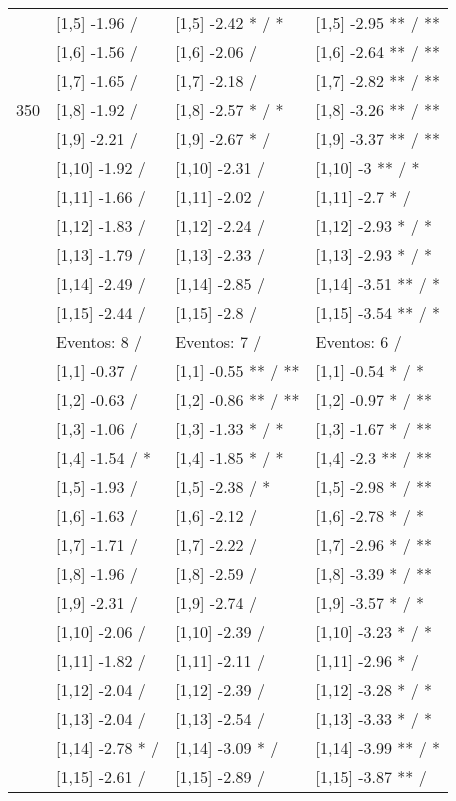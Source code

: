 \begin{table}
\begin{tabular}[t]{llll}
 & {}[1,5] -1.96  / & {}[1,5] -2.42 * / * & {}[1,5] -2.95 ** / **\\
 & {}[1,6] -1.56  / & {}[1,6] -2.06  / & {}[1,6] -2.64 ** / **\\
 & {}[1,7] -1.65  / & {}[1,7] -2.18  / & {}[1,7] -2.82 ** / **\\
350 & {}[1,8] -1.92  / & {}[1,8] -2.57 * / * & {}[1,8] -3.26 ** / **\\
\addlinespace
 & {}[1,9] -2.21  / & {}[1,9] -2.67 * / & {}[1,9] -3.37 ** / **\\
 & {}[1,10] -1.92  / & {}[1,10] -2.31  / & {}[1,10] -3 ** / *\\
 & {}[1,11] -1.66  / & {}[1,11] -2.02  / & {}[1,11] -2.7 * /\\
 & {}[1,12] -1.83  / & {}[1,12] -2.24  / & {}[1,12] -2.93 * / *\\
 & {}[1,13] -1.79  / & {}[1,13] -2.33  / & {}[1,13] -2.93 * / *\\
\addlinespace
 & {}[1,14] -2.49  / & {}[1,14] -2.85  / & {}[1,14] -3.51 ** / *\\
 & {}[1,15] -2.44  / & {}[1,15] -2.8  / & {}[1,15] -3.54 ** / *\\
 & Eventos:  8 / & Eventos:  7 / & Eventos:  6 /\\
 & {}[1,1] -0.37  / & {}[1,1] -0.55 ** / ** & {}[1,1] -0.54 * / *\\
 & {}[1,2] -0.63  / & {}[1,2] -0.86 ** / ** & {}[1,2] -0.97 * / **\\
\addlinespace
 & {}[1,3] -1.06  / & {}[1,3] -1.33 * / * & {}[1,3] -1.67 * / **\\
 & {}[1,4] -1.54  / * & {}[1,4] -1.85 * / * & {}[1,4] -2.3 ** / **\\
 & {}[1,5] -1.93  / & {}[1,5] -2.38  / * & {}[1,5] -2.98 * / **\\
 & {}[1,6] -1.63  / & {}[1,6] -2.12  / & {}[1,6] -2.78 * / *\\
 & {}[1,7] -1.71  / & {}[1,7] -2.22  / & {}[1,7] -2.96 * / **\\
\addlinespace
500 & {}[1,8] -1.96  / & {}[1,8] -2.59  / & {}[1,8] -3.39 * / **\\
 & {}[1,9] -2.31  / & {}[1,9] -2.74  / & {}[1,9] -3.57 * / *\\
 & {}[1,10] -2.06  / & {}[1,10] -2.39  / & {}[1,10] -3.23 * / *\\
 & {}[1,11] -1.82  / & {}[1,11] -2.11  / & {}[1,11] -2.96 * /\\
 & {}[1,12] -2.04  / & {}[1,12] -2.39  / & {}[1,12] -3.28 * / *\\
\addlinespace
 & {}[1,13] -2.04  / & {}[1,13] -2.54  / & {}[1,13] -3.33 * / *\\
 & {}[1,14] -2.78 * / & {}[1,14] -3.09 * / & {}[1,14] -3.99 ** / *\\
 & {}[1,15] -2.61  / & {}[1,15] -2.89  / & {}[1,15] -3.87 ** /\\
\bottomrule
\end{tabular}
\end{table}
